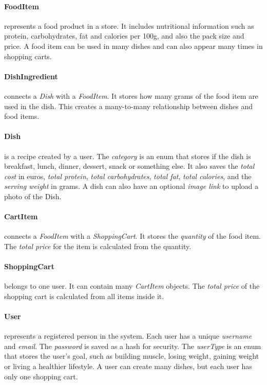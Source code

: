 \documentclass[11pt]{article}
\begin{document}
\paragraph{FoodItem} represents a food product in a store. 
It includes nutritional information such as protein, carbohydrates, fat and calories per 100g, and also the pack size and price. 
A food item can be used in many dishes and can also appear many times in shopping carts.

\paragraph{DishIngredient} connects a \textit{Dish} with a \textit{FoodItem}.
It stores how many grams of the food item are used in the dish.
This creates a many-to-many relationship between dishes and food items.

\paragraph{Dish} is a recipe created by a user. 
The \textit{category} is an enum that stores if the dish is breakfast, lunch, dinner, dessert, snack or something else.
It also saves the 
\textit{total cost} in euros, 
\textit{total protein}, 
\textit{total carbohydrates}, 
\textit{total fat}, 
\textit{total calories}, 
and the \textit{serving weight} in grams.
A dish can also have an optional \textit{image link} to upload a photo of the Dish.

\paragraph{CartItem} connects a \textit{FoodItem} with a \textit{ShoppingCart}.
It stores the \textit{quantity} of the food item.
The \textit{total price} for the item is calculated from the quantity.

\paragraph{ShoppingCart} belongs to one user.
It can contain many \textit{CartItem} objects.
The \textit{total price} of the shopping cart is calculated from all items inside it.

\paragraph{User} represents a registered person in the system. 
Each user has a unique \textit{username} and \textit{email}. 
The \textit{password} is saved as a hash for security.
The \textit{userType} is an enum that stores the user's goal, such as building muscle, losing weight, gaining weight or living a healthier lifestyle.
A user can create many dishes, but each user has only one shopping cart.
\end{document}
